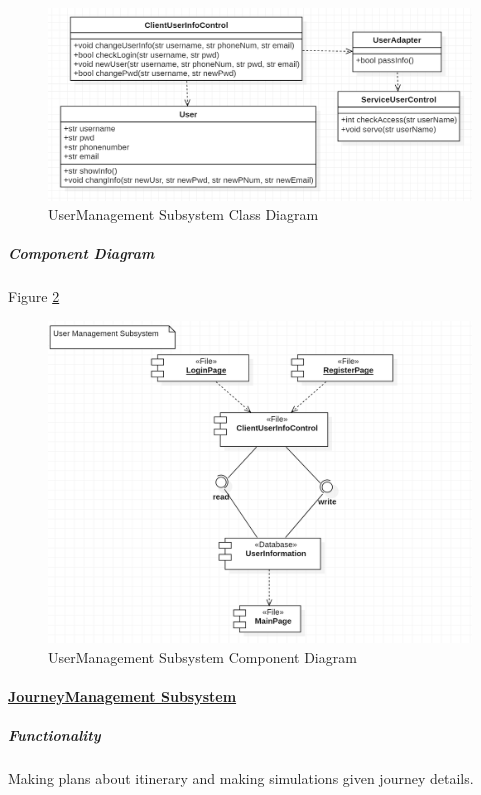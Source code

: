 \documentclass[10pt]{article}
\begin{document}
\begin{figure}[H]
	\centering
	
	\includegraphics[width=14cm]{usermanageclass.png}
	\caption{UserManagement Subsystem Class Diagram}
	\label{UserManagement Subsystem Class Diagram}
\end{figure}

\subparagraph{Component Diagram} Figure \ref{UserManagement Subsystem Component Diagram}

\begin{figure}[H]
	\centering
	
	\includegraphics[width=14cm]{usermanagecom.png}
	\caption{UserManagement Subsystem Component Diagram}
	\label{UserManagement Subsystem Component Diagram}
\end{figure}

\paragraph{\underline{JourneyManagement Subsystem}}
\subparagraph{Functionality} Making plans about itinerary and making simulations given journey details.
\end{document}
